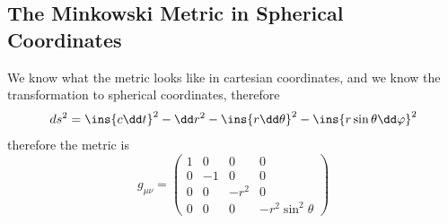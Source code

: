 \subsection{The Minkowski Metric in Spherical Coordinates}
We know what the metric looks like in cartesian coordinates, and we know the transformation to spherical coordinates, therefore
\begin{equation}
    ds^2 = \ins{c\dd t}^2 - \dd r^2 - \ins{r\dd \theta}^2 - \ins{r\sin\theta\dd \varphi}^2
\end{equation}
therefore the metric is
\begin{equation}
    g_{\mu\nu} = \begin{pmatrix}
        1&0&0&0 \\ 0&-1&0&0 \\ 0&0&-r^2&0 \\ 0&0&0&-r^2\sin^2\theta
    \end{pmatrix}
\end{equation}